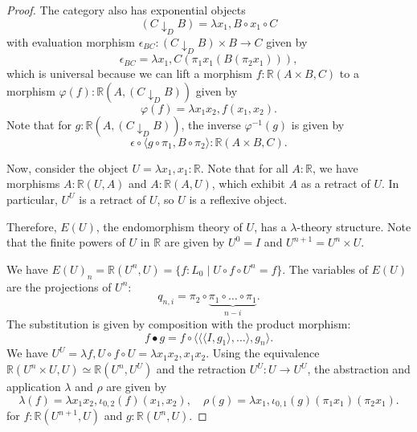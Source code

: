 \begin{proof}
  The category also has exponential objects
  \[ (C \downarrow_D B) = \lambda x_1, B \circ x_1 \circ C \]
  with evaluation morphism $ \epsilon_{BC}: (C \downarrow_D B) \times B \to C $ given by
  \[ \epsilon_{BC} = \lambda x_1, C(\pi_1 x_1 (B (\pi_2 x_1))), \]
  which is universal because we can lift a morphism $ f: \mathbb R(A \times B, C) $ to a morphism $ \varphi(f): \mathbb R(A, (C \downarrow_D B)) $ given by
  \[ \varphi(f) = \lambda x_1 x_2, f (x_1, x_2). \]
  Note that for $ g: \mathbb R(A, (C \downarrow_D B)) $, the inverse $ \varphi^{-1}(g) $ is given by
  \[ \epsilon \circ \langle g \circ \pi_1, B \circ \pi_2 \rangle: \mathbb R(A \times B, C). \]

  Now, consider the object $ U = \lambda x_1, x_1 : \mathbb R $. Note that for all $ A: \mathbb R $, we have morphisms $ A: \mathbb R(U, A) $ and $ A: \mathbb R(A, U) $, which exhibit $ A $ as a retract of $ U $. In particular, $ U^U $ is a retract of $ U $, so $ U $ is a reflexive object.

  Therefore, $ E(U) $, the endomorphism theory of $ U $, has a $ \lambda $-theory structure. Note that the finite powers of $ U $ in $ \mathbb R $ are given by $ U^0 = I $ and $ U^{n + 1} = U^n \times U $.

  We have $ E(U)_n = \mathbb R(U^n, U) = \{ f: L_0 \mid U \circ f \circ U^n = f \} $. The variables of $ E(U) $ are the projections of $ U^n $:
  \[ q_{n, i} = \pi_2 \circ \underbrace{\pi_1 \circ \dots \circ \pi_1}_{n - i}. \]
  The substitution is given by composition with the product morphism:
  \[ f \bullet g = f \circ \langle \langle \langle I, g_1 \rangle, \dots \rangle, g_n \rangle. \]
  We have $ U^U = \lambda f, U \circ f \circ U = \lambda x_1 x_2, x_1 x_2 $. Using the equivalence $ \mathbb R(U^n \times U, U) \simeq \mathbb R(U^n, U^U) $ and the retraction $ U^U: U \to U^U $, the abstraction and application $ \lambda $ and $ \rho $ are given by
  \[ \lambda(f) = \lambda x_1 x_2, \iota_{0, 2}(f)(x_1, x_2), \quad \rho(g) = \lambda x_1, \iota_{0, 1}(g) (\pi_1 x_1) (\pi_2 x_1). \]
  for $ f: \mathbb R(U^{n + 1}, U) $ and $ g: \mathbb R(U^n, U) $.


\end{proof}
